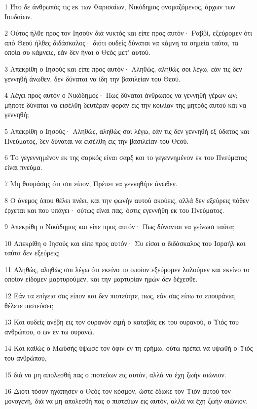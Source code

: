 \par 1 Ήτο δε άνθρωπός τις εκ των Φαρισαίων, Νικόδημος ονομαζόμενος, άρχων των Ιουδαίων.
\par 2 Ούτος ήλθε προς τον Ιησούν διά νυκτός και είπε προς αυτόν· Ραββί, εξεύρομεν ότι από Θεού ήλθες διδάσκαλος· διότι ουδείς δύναται να κάμνη τα σημεία ταύτα, τα οποία συ κάμνεις, εάν δεν ήναι ο Θεός μετ' αυτού.
\par 3 Απεκρίθη ο Ιησούς και είπε προς αυτόν· Αληθώς, αληθώς σοι λέγω, εάν τις δεν γεννηθή άνωθεν, δεν δύναται να ίδη την βασιλείαν του Θεού.
\par 4 Λέγει προς αυτόν ο Νικόδημος· Πως δύναται άνθρωπος να γεννηθή γέρων ων; μήποτε δύναται να εισέλθη δευτέραν φοράν εις την κοιλίαν της μητρός αυτού και να γεννηθή;
\par 5 Απεκρίθη ο Ιησούς· Αληθώς, αληθώς σοι λέγω, εάν τις δεν γεννηθή εξ ύδατος και Πνεύματος, δεν δύναται να εισέλθη εις την βασιλείαν του Θεού.
\par 6 Το γεγεννημένον εκ της σαρκός είναι σαρξ και το γεγεννημένον εκ του Πνεύματος είναι πνεύμα.
\par 7 Μη θαυμάσης ότι σοι είπον, Πρέπει να γεννηθήτε άνωθεν.
\par 8 Ο άνεμος όπου θέλει πνέει, και την φωνήν αυτού ακούεις, αλλά δεν εξεύρεις πόθεν έρχεται και που υπάγει· ούτως είναι πας, όστις εγεννήθη εκ του Πνεύματος.
\par 9 Απεκρίθη ο Νικόδημος και είπε προς αυτόν· Πως δύνανται να γείνωσι ταύτα;
\par 10 Απεκρίθη ο Ιησούς και είπε προς αυτόν· Συ είσαι ο διδάσκαλος του Ισραήλ και ταύτα δεν εξεύρεις;
\par 11 Αληθώς, αληθώς σοι λέγω ότι εκείνο το οποίον εξεύρομεν λαλούμεν και εκείνο το οποίον είδομεν μαρτυρούμεν, και την μαρτυρίαν ημών δεν δέχεσθε.
\par 12 Εάν τα επίγεια σας είπον και δεν πιστεύητε, πως, εάν σας είπω τα επουράνια, θέλετε πιστεύσει;
\par 13 Και ουδείς ανέβη εις τον ουρανόν ειμή ο καταβάς εκ του ουρανού, ο Υιός του ανθρώπου, ο ων εν τω ουρανώ.
\par 14 Και καθώς ο Μωϋσής ύψωσε τον όφιν εν τη ερήμω, ούτω πρέπει να υψωθή ο Υιός του ανθρώπου,
\par 15 διά να μη απολεσθή πας ο πιστεύων εις αυτόν, αλλά να έχη ζωήν αιώνιον.
\par 16 Διότι τόσον ηγάπησεν ο Θεός τον κόσμον, ώστε έδωκε τον Υιόν αυτού τον μονογενή, διά να μη απολεσθή πας ο πιστεύων εις αυτόν, αλλά να έχη ζωήν αιώνιον.
